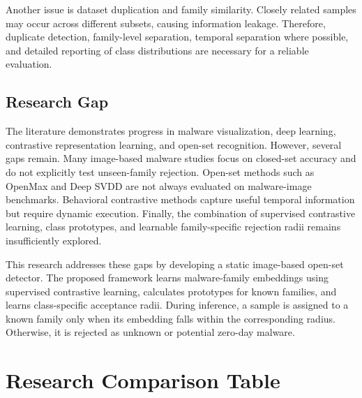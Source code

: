 \documentclass[12pt,a4paper]{article}
\begin{document}
Another issue is dataset duplication and family similarity. Closely related samples may occur across different subsets, causing information leakage. Therefore, duplicate detection, family-level separation, temporal separation where possible, and detailed reporting of class distributions are necessary for a reliable evaluation.

\subsection{Research Gap}

The literature demonstrates progress in malware visualization, deep learning, contrastive representation learning, and open-set recognition. However, several gaps remain. Many image-based malware studies focus on closed-set accuracy and do not explicitly test unseen-family rejection. Open-set methods such as OpenMax and Deep SVDD are not always evaluated on malware-image benchmarks. Behavioral contrastive methods capture useful temporal information but require dynamic execution. Finally, the combination of supervised contrastive learning, class prototypes, and learnable family-specific rejection radii remains insufficiently explored.

This research addresses these gaps by developing a static image-based open-set detector. The proposed framework learns malware-family embeddings using supervised contrastive learning, calculates prototypes for known families, and learns class-specific acceptance radii. During inference, a sample is assigned to a known family only when its embedding falls within the corresponding radius. Otherwise, it is rejected as unknown or potential zero-day malware.

\clearpage
\section{Research Comparison Table}

\small

\setlength{\tabcolsep}{3pt}
\renewcommand{\arraystretch}{1.18}
\end{document}

